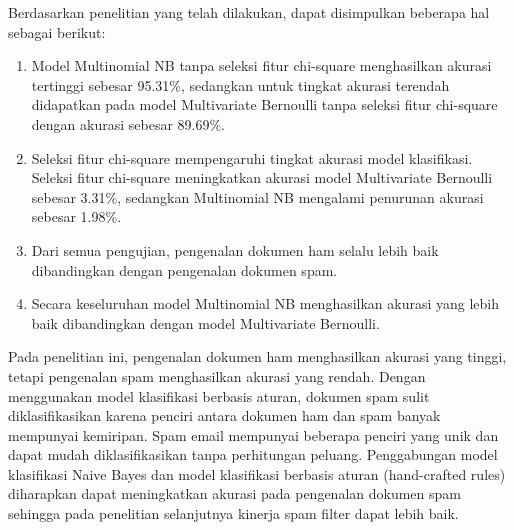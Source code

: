 Berdasarkan penelitian yang telah dilakukan, dapat disimpulkan beberapa hal sebagai berikut:
\begin{enumerate}
	\item Model Multinomial NB tanpa seleksi fitur chi-square menghasilkan akurasi tertinggi sebesar 95.31\%, sedangkan untuk tingkat akurasi terendah didapatkan pada model Multivariate Bernoulli tanpa seleksi fitur chi-square dengan akurasi sebesar 89.69\%.
	\item Seleksi fitur chi-square mempengaruhi tingkat akurasi model klasifikasi. Seleksi fitur chi-square meningkatkan akurasi model Multivariate Bernoulli sebesar 3.31\%, sedangkan Multinomial NB mengalami penurunan akurasi sebesar 1.98\%.
	\item Dari semua pengujian, pengenalan dokumen ham selalu lebih baik dibandingkan dengan pengenalan dokumen spam.
	\item Secara keseluruhan model Multinomial NB menghasilkan akurasi yang lebih baik dibandingkan dengan model Multivariate Bernoulli.
\end{enumerate}

Pada penelitian ini, pengenalan dokumen ham menghasilkan akurasi yang tinggi, tetapi pengenalan spam menghasilkan akurasi yang rendah. Dengan menggunakan model klasifikasi berbasis aturan, dokumen spam sulit diklasifikasikan karena penciri antara dokumen ham dan spam banyak mempunyai kemiripan. Spam email mempunyai beberapa penciri yang unik dan dapat mudah diklasifikasikan tanpa perhitungan peluang. Penggabungan model klasifikasi Naive Bayes dan model klasifikasi berbasis aturan (hand-crafted rules) diharapkan dapat meningkatkan akurasi pada pengenalan dokumen spam sehingga pada penelitian selanjutnya kinerja spam filter dapat lebih baik.
